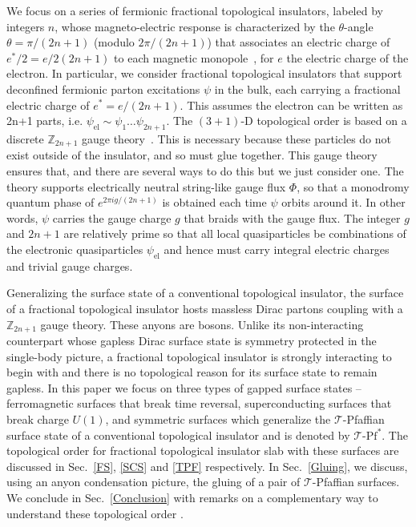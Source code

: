 We focus on a series of fermionic fractional topological insulators, labeled by integers $n$, whose magneto-electric response is characterized by the $\theta$-angle $\theta=\pi/(2n+1)$ (modulo $2\pi/(2n+1)$) that associates an electric charge of $e^\ast/2=e/2(2n+1)$ to each magnetic monopole~\cite{Witten79}, for $e$ the electric charge of the electron. In particular, we consider fractional topological insulators that support deconfined fermionic parton excitations $\psi$ in the bulk, each carrying a fractional electric charge of $e^\ast=e/(2n+1)$. This assumes the electron can be written as 2n+1 parts, i.e.  $\psi_{\mathrm{el}}\sim\psi_1\ldots\psi_{2n+1}$. The $(3+1)$-D topological order is based on a discrete $\mathbb{Z}_{2n+1}$ gauge theory~\cite{maciejko2012models}. This is necessary because these particles do not exist outside of the insulator, and so must glue together. This gauge theory ensures that, and there are several ways to do this but we just consider one.  The theory supports electrically neutral string-like gauge flux $\Phi$, so that a monodromy quantum phase of $e^{2\pi ig/(2n+1)}$ is obtained each time $\psi$ orbits around it. In other words, $\psi$ carries the gauge charge $g$ that braids with the gauge flux. The integer $g$ and $2n+1$ are relatively prime so that all local quasiparticles be combinations of the electronic quasiparticles $\psi_{\mathrm{el}}$ and hence must carry integral electric charges and trivial gauge charges.

Generalizing the surface state of a conventional topological insulator, the surface of a fractional topological insulator hosts massless Dirac partons coupling with a $\mathbb{Z}_{2n+1}$ gauge theory. These anyons are bosons. Unlike its non-interacting counterpart whose gapless Dirac surface state is symmetry protected in the single-body picture, a fractional topological insulator is strongly interacting to begin with and there is no topological reason for its surface state to remain gapless. In this paper we focus on three types of gapped surface states -- ferromagnetic surfaces that break time reversal, superconducting surfaces that break charge $U(1)$, and symmetric surfaces which generalize the $\mathcal{T}$-Pfaffian surface state of a conventional topological insulator and is denoted by {$\mathcal{T}$-$\mathrm{Pf}^\ast$}. The topological order for fractional topological insulator slab with these surfaces are discussed in Sec.~\ref{FS}, \ref{SCS} and \ref{TPF} respectively. In Sec.~\ref{Gluing}, we discuss, using an anyon condensation picture, the gluing of a pair of $\mathcal{T}$-Pfaffian surfaces. We conclude in Sec.~\ref{Conclusion} with remarks on a complementary way to understand these topological order \cite{ChoTeoFradkin17}.